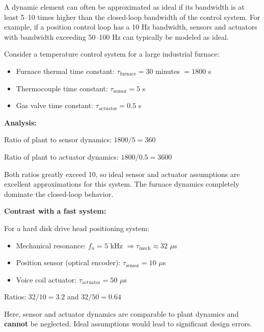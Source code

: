 \begin{keyconceptbox}[title=Rule of Thumb for Neglecting Dynamics]
A dynamic element can often be approximated as ideal if its bandwidth is at least 5--10 times higher than the closed-loop bandwidth of the control system. For example, if a position control loop has a 10 Hz bandwidth, sensors and actuators with bandwidth exceeding 50--100 Hz can typically be modeled as ideal.
\end{keyconceptbox}

\begin{examplebox}[title=Example 2.4: Validity of Ideal Assumptions]
Consider a temperature control system for a large industrial furnace:
\begin{itemize}
    \item Furnace thermal time constant: $\tau_{\text{furnace}} = 30$ minutes $= 1800$ s
    \item Thermocouple time constant: $\tau_{\text{sensor}} = 5$ s
    \item Gas valve time constant: $\tau_{\text{actuator}} = 0.5$ s
\end{itemize}

\textbf{Analysis:}

Ratio of plant to sensor dynamics: $1800/5 = 360$

Ratio of plant to actuator dynamics: $1800/0.5 = 3600$

Both ratios greatly exceed 10, so ideal sensor and actuator assumptions are excellent approximations for this system. The furnace dynamics completely dominate the closed-loop behavior.

\textbf{Contrast with a fast system:}

For a hard disk drive head positioning system:
\begin{itemize}
    \item Mechanical resonance: $f_n = 5$ kHz $\Rightarrow \tau_{\text{mech}} \approx 32$ $\mu$s
    \item Position sensor (optical encoder): $\tau_{\text{sensor}} = 10$ $\mu$s
    \item Voice coil actuator: $\tau_{\text{actuator}} = 50$ $\mu$s
\end{itemize}

Ratios: $32/10 = 3.2$ and $32/50 = 0.64$

Here, sensor and actuator dynamics are comparable to plant dynamics and \textbf{cannot} be neglected. Ideal assumptions would lead to significant design errors.
\end{examplebox}

